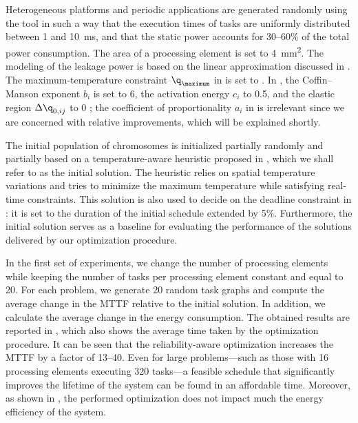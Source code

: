 Heterogeneous platforms and periodic applications are generated randomly using
the  tool \cite{dick1998} in such a way that the execution times of
tasks are uniformly distributed between 1 and 10~ms, and that the static power
accounts for 30--60\% of the total power consumption. The area of a processing
element is set to 4~mm\textsuperscript{2}. The modeling of the leakage power is
based on the linear approximation discussed in
. The maximum-temperature constraint
$\q_\maximum$ in  is set to . In
, the Coffin--Manson exponent $b_i$ is set to
6, the activation energy $c_i$ to 0.5, and the elastic region $\Delta \q_{0,
ij}$ to 0 \cite{jedec2016}; the coefficient of proportionality $a_i$ in
 is irrelevant since we are concerned with
relative improvements, which will be explained shortly.

The initial population of chromosomes is initialized partially randomly and
partially based on a temperature-aware heuristic proposed in \cite{xie2006},
which we shall refer to as the initial solution. The heuristic relies on spatial
temperature variations and tries to minimize the maximum temperature while
satisfying real-time constraints. This solution is also used to decide on the
deadline constraint \period in : it is set to
the duration of the initial schedule extended by 5\%. Furthermore, the initial
solution serves as a baseline for evaluating the performance of the solutions
delivered by our optimization procedure.

In the first set of experiments, we change the number of processing elements \np
while keeping the number of tasks \nt per processing element constant and equal
to 20. For each problem, we generate 20 random task graphs and compute the
average change in the \ac{MTTF} relative to the initial solution. In addition,
we calculate the average change in the energy consumption. The obtained results
are reported in , which also shows the average
time taken by the optimization procedure. It can be seen that the
reliability-aware optimization increases the \ac{MTTF} by a factor of 13--40.
Even for large problems---such as those with 16 processing elements executing
320 tasks---a feasible schedule that significantly improves the lifetime of the
system can be found in an affordable time. Moreover, as shown in
, the performed optimization does not impact much
the energy efficiency of the system.

